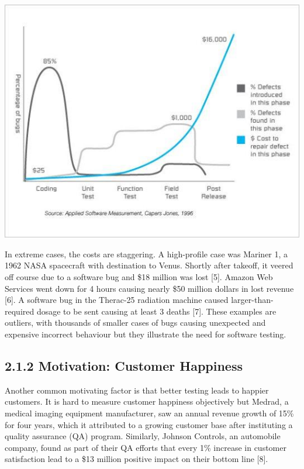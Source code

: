 \documentclass[12pt]{report}
\begin{document}
\begin{center}
\includegraphics[scale=0.7]{cost-test}
\end{center}
\par\noindent
In extreme cases, the costs are staggering. A high-profile case was Mariner 1, a 1962 NASA spacecraft with destination to Venus. Shortly after takeoff, it veered off course due to a software bug and \$18 million was lost [5]. Amazon Web Services went down for 4 hours causing nearly \$50 million dollars in lost revenue [6]. A software bug in the Therac-25 radiation machine caused larger-than-required dosage to be sent causing at least 3 deaths [7]. These examples are outliers, with thousands of smaller cases of bugs causing unexpected and expensive incorrect behaviour but they illustrate the need for software testing.

\subsection*{2.1.2 Motivation: Customer Happiness}
\par\noindent
Another common motivating factor is that better testing leads to happier customers. It is hard to measure customer happiness objectively but Medrad, a medical imaging equipment manufacturer, saw an annual revenue growth of 15\% for four years, which it attributed to a growing customer base after instituting a quality assurance (QA) program. Similarly, Johnson Controls, an automobile company, found as part of their QA efforts that every 1\% increase in customer satisfaction lead to a \$13 million positive impact on their bottom line [8].
\end{document}

